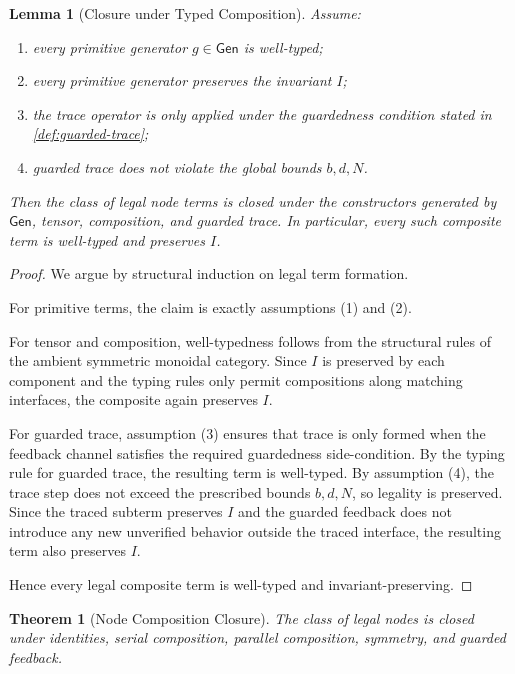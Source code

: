 \documentclass[11pt]{article}
\newtheorem{theorem}{Theorem}[section]
\newtheorem{lemma}{Lemma}[section]
\theoremstyle{remark}
\begin{document}
\begin{lemma}[Closure under Typed Composition]\label{lem:closure-typed-composition}
Assume:
\begin{enumerate}
\item every primitive generator \(g \in \mathsf{Gen}\) is well-typed;
\item every primitive generator preserves the invariant \(I\);
\item the trace operator is only applied under the guardedness condition stated in \cref{def:guarded-trace};
\item guarded trace does not violate the global bounds \(b,d,N\).
\end{enumerate}
Then the class of legal node terms is closed under the constructors generated by \(\mathsf{Gen}\), tensor, composition, and guarded trace. In particular, every such composite term is well-typed and preserves \(I\).
\end{lemma}

\begin{proof}
We argue by structural induction on legal term formation.

For primitive terms, the claim is exactly assumptions (1) and (2).

For tensor and composition, well-typedness follows from the structural rules of the ambient symmetric monoidal category. Since \(I\) is preserved by each component and the typing rules only permit compositions along matching interfaces, the composite again preserves \(I\).

For guarded trace, assumption (3) ensures that trace is only formed when the feedback channel satisfies the required guardedness side-condition. By the typing rule for guarded trace, the resulting term is well-typed. By assumption (4), the trace step does not exceed the prescribed bounds \(b,d,N\), so legality is preserved. Since the traced subterm preserves \(I\) and the guarded feedback does not introduce any new unverified behavior outside the traced interface, the resulting term also preserves \(I\).

Hence every legal composite term is well-typed and invariant-preserving.
\end{proof}

\begin{theorem}[Node Composition Closure]
The class of legal nodes is closed under identities, serial composition, parallel composition, symmetry, and guarded feedback.
\end{theorem}
\end{document}
